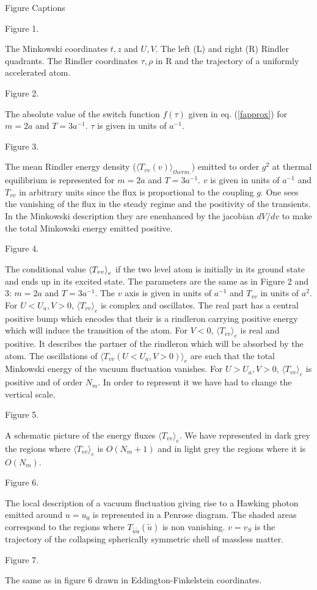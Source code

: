 \vfill \newpage

Figure Captions

Figure 1.

\noindent The Minkowski coordinates $t,z$ and $U,V$. The
left (L) and right (R) Rindler quadrants. The Rindler coordinates $\tau ,
\rho$ in R and the trajectory of a uniformly accelerated atom.

Figure 2.

\noindent The absolute value of the switch function $f(\tau)$ given in eq.
(\ref{fapprox}) for $m=2a$ and $T=3 a^{-1}$. $\tau$ is given in units of
$a^{-1}$.

Figure 3.

\noindent The mean Rindler energy density ($\langle
T_{vv}(v)\rangle_{therm.}$) emitted to order $g^2$ at thermal equilibrium
 is represented
for  $m=2a$ and $T=3a^{-1}$. $v$ is given in units of $a^{-1}$ and $T_{vv}$ in
arbitrary units since the flux is proportional to the coupling $g$.
One sees the vanishing of the flux in the steady regime and the positivity
of the transients.
In the Minkowski description they are enenhanced by the jacobian $dV/dv$ to
make the total
Minkowski energy emitted positive.

Figure 4.

\noindent The conditional value $\mbox{$ \langle T_{vv} \rangle $}_e$ if the two level
atom is initially in its ground state and ends up in its excited state. The
parameters are the same as in Figure 2 and 3: $m=2a$ and $T = 3 a^{-1}$. The
$v$ axis is given in units of $a^{-1}$ and $T_{vv}$ in units of $a^2$.
For  $U<U_a, V>0$, $\langle T_{vv} \rangle _e$ is complex and oscillates. The
real part has a central positive bump which encodes that their is a
rindleron carrying positive energy which will induce the transition of the
atom. For $V<0$, $\langle T_{vv} \rangle _e$
is real and positive. It describes the partner of the rindleron which will
be absorbed by the atom. The oscillations of $\langle T_{vv}
(U<U_a, V>0) \rangle _e$ are such that the total Minkowski energy of the
vacuum fluctuation vanishes. For $U>U_a, V>0$, $\langle T_{vv} \rangle _e$
is positive and of order $N_m$. In order to represent it we have had to
change the vertical scale.

Figure 5.

\noindent A schematic picture of the energy fluxes $\langle T_{vv} \rangle
_e$. We have represented in dark grey the regions where
$\langle T_{vv} \rangle_e$ is $O(N_m+1)$ and in light grey the regions
where it is $O(N_m)$.

Figure 6.

\noindent The local description of a vacuum fluctuation
giving rise to a Hawking photon emitted around $u=u_0$ is
represented in a Penrose diagram. The shaded areas
correspond to the regions where
$T_{\tilde u \tilde u}(\tilde u)$ is non vanishing.
$v=v_S$ is the trajectory of the collapsing spherically
symmetric shell of massless matter.

Figure 7.

\noindent The same as in figure 6 drawn in
Eddington-Finkelstein coordinates.








